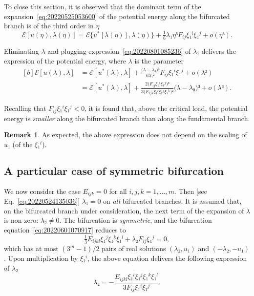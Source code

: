 \documentclass[12pt, final]{scrartcl}
\theoremstyle{definition}
\newtheorem{remark}{Remark}
\begin{document}
To close this section, it is observed that the dominant term of the
expansion~\eqref{eq:20220525053600} of the potential energy along the bifurcated
branch is of the third order in \(η\)
\begin{equation}
  ℰ[u(η), λ(η)] = ℰ\{u^{\ast}[λ(η)], λ(η)\} + \tfrac{1}{6} λ₁ η³ F_{i j} ξ₁^i ξ₁^j + o(η³).
\end{equation}

Eliminating \(λ\) and plugging expression~\eqref{eq:20220801085236} of \(λ₁\)
delivers the expression of the potential energy, where \(λ\) is the parameter
\begin{equation}
  \begin{aligned}[b]
    ℰ[u(λ), λ] &= ℰ[u^{\ast}(λ), λ] + \frac{\bigl(λ - λ₀\bigr)³}{6λ₁²} F_{i j} ξ₁^i ξ₁^j + o(λ³)\\
    &= ℰ[u^{\ast}(λ), λ] + \frac{2 \bigl( F_{i j} ξ₁^i ξ₁^j \bigr)³}{3 \bigl( E_{ijk} ξ₁^i ξ₁^j ξ₁^k \bigr)²} \bigl(λ - λ₀\bigr)³ + o(λ³).
  \end{aligned}
\end{equation}

Recalling that \(F_{i j} ξ₁^i ξ₁^j < 0\), it is found that, above the critical
load, the potential energy is \emph{smaller} along the bifurcated branch than
along the fundamental branch.

\begin{remark}
  As expected, the above expression does not depend on the scaling of \(u₁\) (of the \(ξ₁^i\)).
\end{remark}

\subsection{A particular case of symmetric bifurcation}

We now consider the case \(E_{ijk}=0\) for all \(i, j, k = 1, \ldots, m\). Then
[see Eq.~\eqref{eq:20220524135036}] \(λ₁ = 0\) on \emph{all} bifurcated
branches. It is assumed that, on the bifurcated branch under consideration, the
next term of the expansion of \(λ\) is non-zero: \(λ₂ ≠ 0\). The bifurcation is
\emph{symmetric}, and the bifurcation equation~\eqref{eq:20220601070917} reduces
to
\begin{equation}
  \label{eq:20220801092222}
  \tfrac{1}{3} E_{ijkl} ξ₁^j ξ₁^k ξ₁^l  + λ₂ F_{ij} ξ₁^j = 0,
\end{equation}
which has at most \((3^m - 1) / 2\) pairs of real solutions \((λ₂, u₁)\) and
\((- λ₂, - u₁)\). Upon multiplication by \(ξ₁^i\), the above equation delivers
the following expression of \(λ₂\)
\begin{equation}
  \label{eq:20220801093236}
  λ₂ = -\frac{E_{ijkl} ξ₁^i ξ₁^j ξ₁^k ξ₁^l}{3 F_{ij} ξ₁^i ξ₁^j}.
\end{equation}
\end{document}
